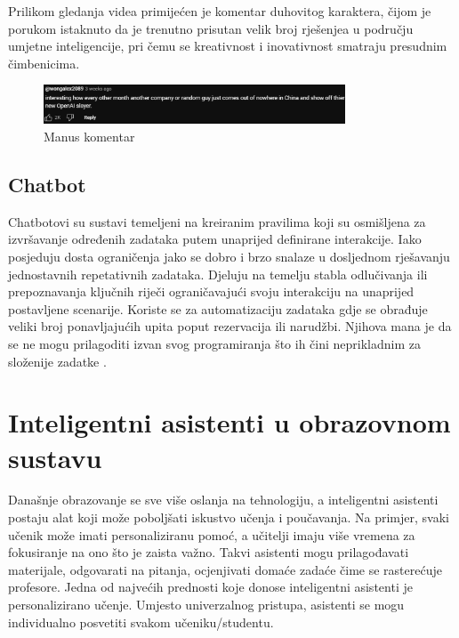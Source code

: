 \documentclass[]{foi}
\begin{document}
Prilikom gledanja videa primijećen je komentar duhovitog karaktera, čijom je porukom istaknuto da je trenutno prisutan velik broj rješenjea u području umjetne inteligencije, pri čemu se 
kreativnost i inovativnost smatraju presudnim čimbenicima. 

\begin{figure}[ht!]
    \centering
    \includegraphics[width=0.8\textwidth]{./assets/Manus_comment.png} 
    \caption{Manus komentar}
    \label{fig:slika4}
\end{figure}


\subsection{Chatbot}

Chatbotovi su sustavi temeljeni na kreiranim pravilima koji su osmišljena za izvršavanje određenih zadataka putem unaprijed definirane interakcije. Iako posjeduju dosta ograničenja jako se dobro
i brzo snalaze u dosljednom rješavanju jednostavnih repetativnih zadataka. Djeluju na temelju stabla odlučivanja ili prepoznavanja ključnih riječi ograničavajući svoju interakciju na unaprijed 
postavljene scenarije. Koriste se za automatizaciju zadataka gdje se obrađuje veliki broj ponavljajućih upita poput rezervacija ili narudžbi. Njihova mana je da se ne mogu prilagoditi izvan
svog programiranja što ih čini neprikladnim za složenije zadatke \cite{exomindset2025difference}.

\section{Inteligentni asistenti u obrazovnom sustavu}

Današnje obrazovanje se sve više oslanja na tehnologiju, a inteligentni asistenti postaju alat koji može poboljšati iskustvo učenja i poučavanja. Na primjer, svaki učenik može imati
personaliziranu pomoć, a učitelji imaju više vremena za fokusiranje na ono što je zaista važno. Takvi asistenti mogu prilagođavati materijale, odgovarati na pitanja, ocjenjivati domaće zadaće
čime se rasterećuje profesore. Jedna od najvećih prednosti koje donose inteligentni asistenti je personalizirano učenje. Umjesto univerzalnog pristupa, asistenti se mogu individualno 
posvetiti svakom učeniku/studentu. 
\end{document}
